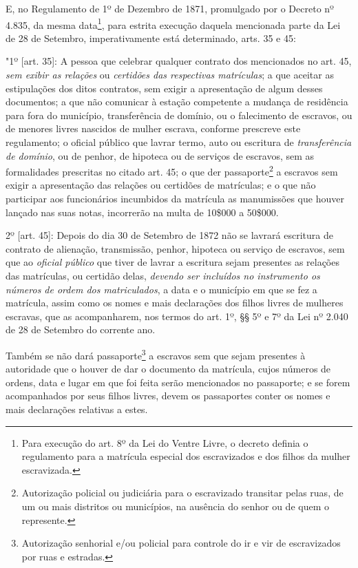 E, no Regulamento de 1º de Dezembro de 1871, promulgado por o Decreto nº
4.835, da mesma data\footnote{Para execução do art. 8º da Lei do
  Ventre Livre, o decreto definia o regulamento para a matrícula
  especial dos escravizados e dos filhos da mulher escravizada.}, para
estrita execução daquela mencionada parte da Lei de 28 de Setembro,
imperativamente está determinado, arts. 35 e 45:

"1º {[}art. 35{]}: A pessoa que celebrar qualquer contrato dos
mencionados no art. 45, \emph{sem exibir as relações} ou \emph{certidões
das respectivas matrículas}; a que aceitar as estipulações dos ditos
contratos, sem exigir a apresentação de algum desses documentos; a que
não comunicar à estação competente a mudança de residência para fora do
município, transferência de domínio, ou o falecimento de escravos, ou de
menores livres nascidos de mulher escrava, conforme prescreve este
regulamento; o oficial público que lavrar termo, auto ou escritura de
\emph{transferência de domínio}, ou de penhor, de hipoteca ou de
serviços de escravos, sem as formalidades prescritas no citado art. 45;
o que der passaporte\footnote{Autorização policial ou judiciária para
  o escravizado transitar pelas ruas, de um ou mais distritos ou
  municípios, na ausência do senhor ou de quem o represente.} a escravos
sem exigir a apresentação das relações ou certidões de matrículas; e o
que não participar aos funcionários incumbidos da matrícula as
manumissões que houver lançado nas suas notas, incorrerão na multa de
10\$000 a 50\$000.

2º {[}art. 45{]}: Depois do dia 30 de Setembro de 1872 não se lavrará
escritura de contrato de alienação, transmissão, penhor, hipoteca ou
serviço de escravos, sem que ao \emph{oficial público} que tiver de
lavrar a escritura sejam presentes as relações das matrículas, ou
certidão delas, \emph{devendo ser incluídos no instrumento os números de
ordem dos matriculados}, a data e o município em que se fez a matrícula,
assim como os nomes e mais declarações dos filhos livres de mulheres
escravas, que as acompanharem, nos termos do art. 1º, §§ 5º e 7º da Lei
nº 2.040 de 28 de Setembro do corrente ano.

Também se não dará passaporte\footnote{Autorização senhorial e/ou
  policial para controle do ir e vir de escravizados por ruas e
  estradas.} a escravos sem que sejam presentes à autoridade que o
houver de dar o documento da matrícula, cujos números de ordens, data e
lugar em que foi feita serão mencionados no passaporte; e se forem
acompanhados por seus filhos livres, devem os passaportes conter os
nomes e mais declarações relativas a estes.

